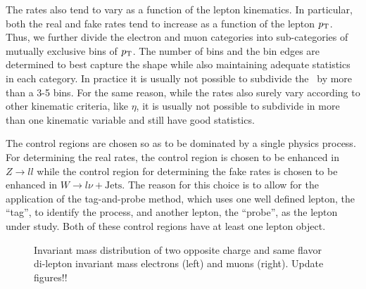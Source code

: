 The rates also tend to vary as a function of the lepton kinematics.
In particular, both the real and fake rates tend to increase
as a function of the lepton $p_{\mathrm{T}}$.  Thus, we further divide the electron
and muon categories into sub-categories of mutually exclusive bins of
$p_{\mathrm{T}}$. The number of bins and the bin edges are determined 
to best capture the shape while also maintaining adequate statistics
in each category. In practice it is usually not possible to subdivide
the \pt~by more than a 3-5 bins. For the same reason, while
the rates also surely vary according to other kinematic criteria, 
like $\eta$, it is usually not possible to subdivide in more than
one kinematic variable and still have good statistics.


The control regions are chosen so as to be dominated by a single 
physics process.  For determining the real rates, the 
control region is chosen to be enhanced in $Z\rightarrow ll$
while the control region for determining the fake rates is
chosen to be enhanced in 
$W\rightarrow l\nu + \textrm{Jets}$.
The reason for this choice is to allow for the application of the
tag-and-probe method, which uses one well defined lepton, the
``tag'', to identify the process, and another lepton, the ``probe'',
as the lepton under study. Both of these control regions
have at least one lepton object. 

\begin{figure}[ht!]
\centering
{}
\centering
{}
\vspace{-10mm}\caption{Invariant mass distribution of two opposite charge and same flavor di-lepton invariant mass electrons (left) and muons (right). Update figures!!}
\label{fig:realEff_CRs}
\end{figure}

